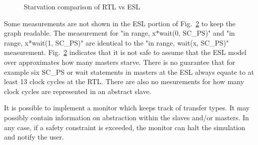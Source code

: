\begin{figure}[hbt]
\begin{subfigure}{.5\textwidth}
  \label{fig:sub2}
\end{subfigure}
\caption{Starvation comparison of RTL vs ESL}
\label{fig:starvation}
\end{figure}

Some measurements are not shown in the ESL portion of Fig.~\ref{fig:starvation} to keep the graph readable. The measurement for "in range, x$*$wait(0, SC\_PS)" and "in range, x*wait(1, SC\_PS)"  are identical to the "in range, wait(x, SC\_PS)" measurement. 
Fig.~\ref{fig:starvation} indicates that it is not safe to assume that the ESL model over approximates how many masters starve. There is no guarantee that for example six SC\_PS or wait statements in masters at the ESL always equate to at least 13 clock cycles at the RTL. There are also no mesurements for how many clock
cycles are represented in an abstract slave. \par
It is possible to implement a monitor which keeps track of transfer types. It may possibly contain information on abstraction within the slaves and/or masters.
In any case, if a safety constraint is exceeded, the monitor can halt the simulation and notify the user.  
  

